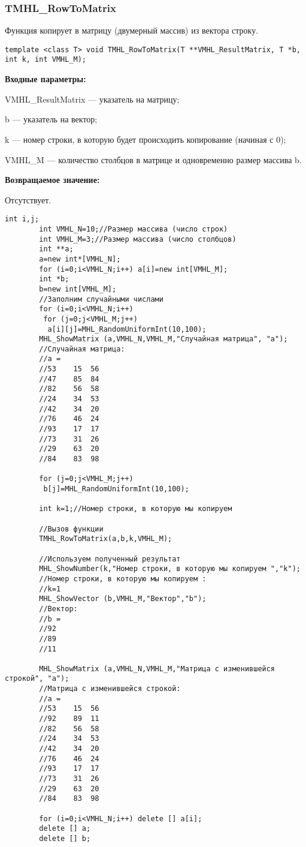 \documentclass[a4paper,12pt]{article}
\begin{document}
\subsubsection{TMHL\_RowToMatrix}\label{TMHL_RowToMatrix}

Функция копирует в матрицу (двумерный массив) из вектора строку.


\begin{lstlisting}[label=code_syntax_TMHL_RowToMatrix,caption=Синтаксис]
template <class T> void TMHL_RowToMatrix(T **VMHL_ResultMatrix, T *b, int k, int VMHL_M);
\end{lstlisting}

\textbf{Входные параметры:}  
 
VMHL\_ResultMatrix --- указатель на матрицу;
 
b --- указатель на вектор;
 
k --- номер строки, в которую будет происходить копирование (начиная с 0);
 
VMHL\_M --- количество столбцов в матрице и одновременно размер массива b.

\textbf{Возвращаемое значение:}

Отсутствует.


\begin{lstlisting}[label=code_use_TMHL_RowToMatrix,caption=Пример использования]
        int i,j;
        int VMHL_N=10;//Размер массива (число строк)
        int VMHL_M=3;//Размер массива (число столбцов)
        int **a;
        a=new int*[VMHL_N];
        for (i=0;i<VMHL_N;i++) a[i]=new int[VMHL_M];
        int *b;
        b=new int[VMHL_M];
        //Заполним случайными числами
        for (i=0;i<VMHL_N;i++)
         for (j=0;j<VMHL_M;j++)
          a[i][j]=MHL_RandomUniformInt(10,100);
        MHL_ShowMatrix (a,VMHL_N,VMHL_M,"Случайная матрица", "a");
        //Случайная матрица:
        //a =	
        //53	15	56
        //47	85	84
        //82	56	58
        //24	34	53
        //42	34	20
        //76	46	24
        //93	17	17
        //73	31	26
        //29	63	20
        //84	83	98

        for (j=0;j<VMHL_M;j++)
         b[j]=MHL_RandomUniformInt(10,100);

        int k=1;//Номер строки, в которую мы копируем

        //Вызов функции
        TMHL_RowToMatrix(a,b,k,VMHL_M);

        //Используем полученный результат
        MHL_ShowNumber(k,"Номер строки, в которую мы копируем ","k");
        //Номер строки, в которую мы копируем :
        //k=1
        MHL_ShowVector (b,VMHL_M,"Вектор","b");
        //Вектор:
        //b =	
        //92
        //89
        //11
        
        MHL_ShowMatrix (a,VMHL_N,VMHL_M,"Матрица с изменившейся строкой", "a");
        //Матрица с изменившейся строкой:
        //a =	
        //53	15	56
        //92	89	11
        //82	56	58
        //24	34	53
        //42	34	20
        //76	46	24
        //93	17	17
        //73	31	26
        //29	63	20
        //84	83	98
        
        for (i=0;i<VMHL_N;i++) delete [] a[i];
        delete [] a;
        delete [] b;
\end{lstlisting}
\end{document}
